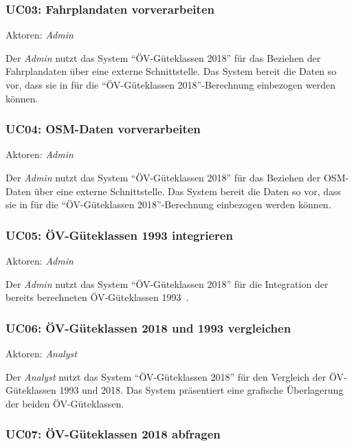 \subsubsection{UC03: Fahrplandaten vorverarbeiten}
\label{Use Cases:UC03}

Aktoren: \emph{Admin}

Der \emph{Admin} nutzt das System "`\acs{ÖV}-Güteklassen 2018"' für das Beziehen der Fahrplandaten über eine externe Schnittstelle.
Das System bereit die Daten so vor, dass sie in  für die "`\acs{ÖV}-Güteklassen 2018"'-Berechnung einbezogen werden können.

\subsubsection{UC04: OSM-Daten vorverarbeiten}
\label{Use Cases:UC04}

Aktoren: \emph{Admin}

Der \emph{Admin} nutzt das System "`\acs{ÖV}-Güteklassen 2018"' für das Beziehen der \acs{OSM}-Daten über eine externe Schnittstelle.
Das System bereit die Daten so vor, dass sie in  für die "`\acs{ÖV}-Güteklassen 2018"'-Berechnung einbezogen werden können.


\subsubsection{UC05: ÖV-Güteklassen 1993 integrieren}
\label{Use Cases:UC05}

Aktoren: \emph{Admin}

Der \emph{Admin} nutzt das System "`\acs{ÖV}-Güteklassen 2018"' für die Integration der bereits berechneten ÖV-Güteklassen 1993~\cite{berechnung_are}.


\subsubsection{UC06: ÖV-Güteklassen 2018 und 1993 vergleichen}
\label{Use Cases:UC06}

Aktoren: \emph{Analyst}

Der \emph{Analyst} nutzt das System "`\acs{ÖV}-Güteklassen 2018"' für den Vergleich der \acs{ÖV}-Güteklassen 1993 und 2018.
Das System präsentiert eine grafische Überlagerung der beiden \acs{ÖV}-Güteklassen.

\subsubsection{UC07: ÖV-Güteklassen 2018 abfragen}
\label{Use Cases:UC07}

